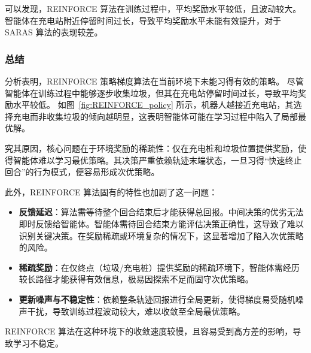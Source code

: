 可以发现，REINFORCE 算法在训练过程中，平均奖励水平较低，且波动较大。智能体在充电站附近停留时间过长，导致平均奖励水平未能有效提升，对于 SARAS 算法的表现较差。

\subsubsection{总结}

分析表明，REINFORCE 策略梯度算法在当前环境下未能习得有效的策略。
尽管智能体在训练过程中能够逐步收集垃圾，但其在充电站停留时间过长，导致平均奖励水平较低。
如图~\ref{fig:REINFORCE_policy} 所示，机器人越接近充电站，其选择充电而非收集垃圾的倾向越明显，这表明智能体可能在学习过程中陷入了局部最优解。

究其原因，核心问题在于环境奖励的稀疏性：仅在充电桩和垃圾位置提供奖励，使得智能体难以学习最优策略。其决策严重依赖轨迹末端状态，一旦习得“快速终止回合”的行为模式，便容易形成次优策略。

此外，REINFORCE 算法固有的特性也加剧了这一问题：
\begin{itemize}
    \item  \textbf{反馈延迟}：算法需等待整个回合结束后才能获得总回报。中间决策的优劣无法即时反馈给智能体。智能体需待回合结束方能评估决策正确性，这导致了难以识别关键决策。在奖励稀疏或环境复杂的情况下，这显著增加了陷入次优策略的风险。
    \item \textbf{稀疏奖励}：在仅终点（垃圾/充电桩）提供奖励的稀疏环境下，智能体需经历较长路径才能获得有效信息，极易因探索不足而固守次优策略。
    \item \textbf{更新噪声与不稳定性}：依赖整条轨迹回报进行全局更新，使得梯度易受随机噪声干扰，导致训练过程波动较大，难以收敛至全局最优策略。
\end{itemize}

REINFORCE 算法在这种环境下的收敛速度较慢，且容易受到高方差的影响，导致学习不稳定。